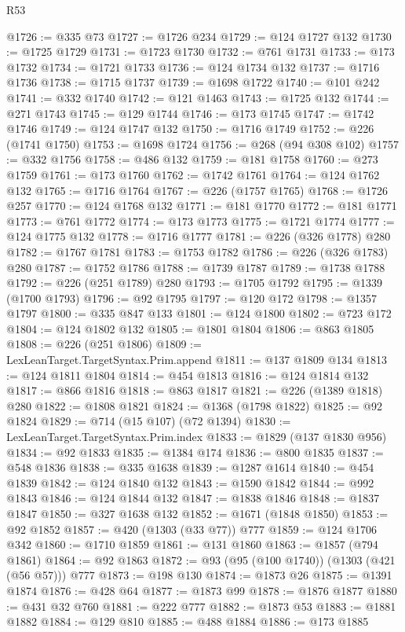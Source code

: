 \begin{lexlean}{R53}
\begin{coremodule}
@1726 := @335 @73
@1727 := @1726 @234
@1729 := @124 @1727 @132
@1730 := @1725 @1729
@1731 := @1723 @1730
@1732 := @761 @1731
@1733 := @173 @1732
@1734 := @1721 @1733
@1736 := @124 @1734 @132
@1737 := @1716 @1736
@1738 := @1715 @1737
@1739 := @1698 @1722
@1740 := @101 @242
@1741 := @332 @1740
@1742 := @121 @1463
@1743 := @1725 @132
@1744 := @271 @1743
@1745 := @129 @1744
@1746 := @173 @1745
@1747 := @1742 @1746
@1749 := @124 @1747 @132
@1750 := @1716 @1749
@1752 := @226 (@1741 @1750)
@1753 := @1698 @1724
@1756 := @268 (@94 @308 @102)
@1757 := @332 @1756
@1758 := @486 @132
@1759 := @181 @1758
@1760 := @273 @1759
@1761 := @173 @1760
@1762 := @1742 @1761
@1764 := @124 @1762 @132
@1765 := @1716 @1764
@1767 := @226 (@1757 @1765)
@1768 := @1726 @257
@1770 := @124 @1768 @132
@1771 := @181 @1770
@1772 := @181 @1771
@1773 := @761 @1772
@1774 := @173 @1773
@1775 := @1721 @1774
@1777 := @124 @1775 @132
@1778 := @1716 @1777
@1781 := @226 (@326 @1778) @280
@1782 := @1767 @1781
@1783 := @1753 @1782
@1786 := @226 (@326 @1783) @280
@1787 := @1752 @1786
@1788 := @1739 @1787
@1789 := @1738 @1788
@1792 := @226 (@251 @1789) @280
@1793 := @1705 @1792
@1795 := @1339 (@1700 @1793)
@1796 := @92 @1795
@1797 := @120 @172
@1798 := @1357 @1797
@1800 := @335 @847 @133
@1801 := @124 @1800
@1802 := @723 @172
@1804 := @124 @1802 @132
@1805 := @1801 @1804
@1806 := @863 @1805
@1808 := @226 (@251 @1806)
@1809 := LexLeanTarget.TargetSyntax.Prim.append
@1811 := @137 @1809 @134
@1813 := @124 @1811 @1804
@1814 := @454 @1813
@1816 := @124 @1814 @132
@1817 := @866 @1816
@1818 := @863 @1817
@1821 := @226 (@1389 @1818) @280
@1822 := @1808 @1821
@1824 := @1368 (@1798 @1822)
@1825 := @92 @1824
@1829 := @714 (@15 @107) (@72 @1394)
@1830 := LexLeanTarget.TargetSyntax.Prim.index
@1833 := @1829 (@137 @1830 @956)
@1834 := @92 @1833
@1835 := @1384 @174
@1836 := @800 @1835
@1837 := @548 @1836
@1838 := @335 @1638
@1839 := @1287 @1614
@1840 := @454 @1839
@1842 := @124 @1840 @132
@1843 := @1590 @1842
@1844 := @992 @1843
@1846 := @124 @1844 @132
@1847 := @1838 @1846
@1848 := @1837 @1847
@1850 := @327 @1638 @132
@1852 := @1671 (@1848 @1850)
@1853 := @92 @1852
@1857 := @420 (@1303 (@33 @77)) @777
@1859 := @124 @1706 @342
@1860 := @1710 @1859
@1861 := @131 @1860
@1863 := @1857 (@794 @1861)
@1864 := @92 @1863
@1872 := @93 (@95 (@100 @1740)) (@1303 (@421 (@56 @57))) @777
@1873 := @198 @130
@1874 := @1873 @26
@1875 := @1391 @1874
@1876 := @428 @64
@1877 := @1873 @99
@1878 := @1876 @1877
@1880 := @431 @32 @760
@1881 := @222 @777
@1882 := @1873 @53
@1883 := @1881 @1882
@1884 := @129 @810
@1885 := @488 @1884
@1886 := @173 @1885

\end{coremodule}
\end{lexlean}

